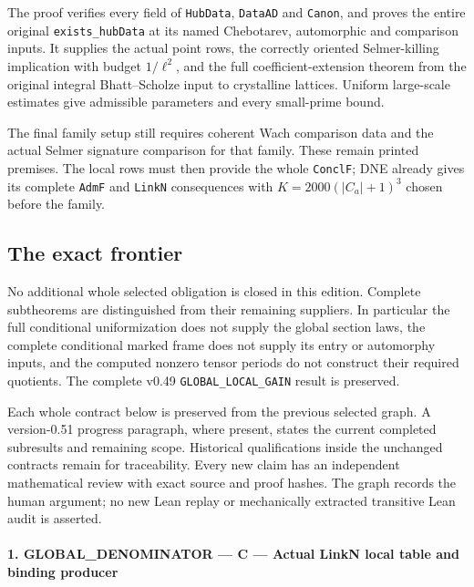 The proof verifies every field of \texttt{Hub\allowbreak Data}, \texttt{Data\allowbreak AD}
and \texttt{Canon}, and proves the entire original
\texttt{exists\_\allowbreak hub\allowbreak Data} at its named Chebotarev, automorphic and
comparison inputs. It supplies the actual point rows, the correctly
oriented Selmer-killing implication with budget $1/\ell^2$, and
the full coefficient-extension theorem from the original integral
Bhatt--Scholze input to crystalline lattices. Uniform large-scale
estimates give admissible parameters and every small-prime bound.

The final family setup still requires coherent Wach comparison
data and the actual Selmer signature comparison for that family.
These remain printed premises. The local rows must then provide
the whole \texttt{Concl\allowbreak F}; DNE already gives its complete
\texttt{Adm\allowbreak F} and \texttt{Link\allowbreak N} consequences with
$K=2000(|C_a|+1)^3$ chosen before the family.

\subsection{The exact frontier}

No additional whole selected obligation is closed in this edition.
Complete subtheorems are distinguished from their remaining
suppliers. In particular the full conditional uniformization does
not supply the global section laws, the complete conditional
marked frame does not supply its entry or automorphy inputs,
and the computed nonzero tensor periods do not construct their
required quotients. The complete v0.49
\texttt{GLOBAL\_\allowbreak LOCAL\_\allowbreak GAIN} result is preserved.

Each whole contract below is preserved from the previous selected
graph. A version-0.51 progress paragraph, where present, states
the current completed subresults and remaining scope. Historical
qualifications inside the unchanged contracts remain for
traceability. Every new claim has an independent mathematical
review with exact source and proof hashes. The graph records
the human argument; no new Lean replay or mechanically extracted
transitive Lean audit is asserted.

\paragraph{1. GLOBAL\_\allowbreak DENOMINATOR — C — Actual LinkN local table and binding producer}

